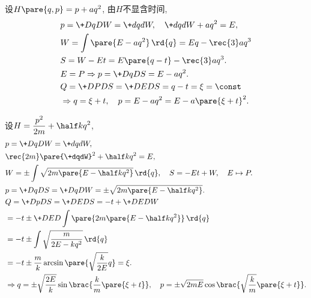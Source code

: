 \documentclass[../LectureNotes.tex]{subfiles}
\begin{document}
\begin{sample}
    \begin{ex}
        设$H\pare{q,p} = p + aq^2$, 由$H$不显含时间,
        \begin{align*}
            & p = \+DqDW = \+dqdW,\quad \+dqdW + aq^2 = E, \\
            & W = \int\pare{E-aq^2}\,\rd{q} = Eq - \rec{3}aq^3 \\
            & S = W-Et = E\pare{q-t} - \rec{3}aq^3. \\
            & E=P\Rightarrow p = \+DqDS = E-aq^2. \\
            & Q = \+DPDS = \+DEDS = q-t = \xi = \const\\
            & \Rightarrow q = \xi + t,\quad p = E-aq^2 = E-a\pare{\xi+t}^2.
        \end{align*}
    \end{ex}
\end{sample}

\begin{sample}
    \begin{ex}
        设$\displaystyle H = \frac{p^2}{2m} + \half kq^2$,
        \begin{align*}
            & p = \+DqDW = \+dqdW, \\
            & \rec{2m}\pare{\+dqdW}^2 + \half kq^2 = E, \\
            & W = \pm \int \sqrt{2m\pare{E-\half kq^2}}\,\rd{q},\quad S = -Et+W, \quad E\mapsto P. \\
            & p = \+DqDS = \+DqDW = \pm\sqrt{2m\pare{E - \half kq^2}}. \\
            & Q = \+DpDS = \+DEDS = -t + \+DEDW \\
            &= -t \pm \+DED{} \int\pare{2m\pare{E-\half kq^2}}\,\rd{q} \\
            &= -t \pm \int \sqrt{\frac{m}{2E-kq^2}}\,\rd{q} \\
            &= -t \pm \frac{m}{k}\arcsin\pare{\sqrt{\frac{k}{2E}}q} = \xi. \\
            &\Rightarrow q = \pm \sqrt{\frac{2E}{k}}\sin\brac{\frac{k}{m}\pare{\xi + t}},\quad p = \pm\sqrt{2mE}\cos\brac{\sqrt{\frac{k}{m}}\pare{\xi + t}}.
        \end{align*}
    \end{ex}
\end{sample}
\end{document}
